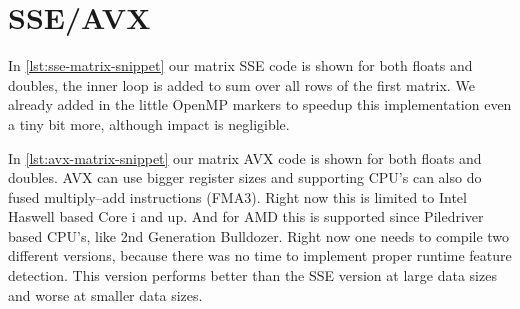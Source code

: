 \documentclass[final]{report}
\begin{document}
\chapter{SSE/AVX}




In \cref{lst:sse-matrix-snippet} our matrix SSE code is shown for both floats and doubles, the inner loop is added to sum over all rows of the first matrix. We already added in the little OpenMP markers to speedup this implementation even a tiny bit more, although impact is negligible.

In \cref{lst:avx-matrix-snippet} our matrix AVX code is shown for both floats and doubles.
AVX can use bigger register sizes and supporting CPU's can also do fused multiply–add instructions (FMA3).
Right now this is limited to Intel Haswell based Core i and up.
And for AMD this is supported since Piledriver based CPU's, like 2nd Generation Bulldozer. 
Right now one needs to compile two different versions, because there was no time to implement proper runtime feature detection.
This version performs better than the SSE version at large data sizes and worse at smaller data sizes. 

\end{document}

